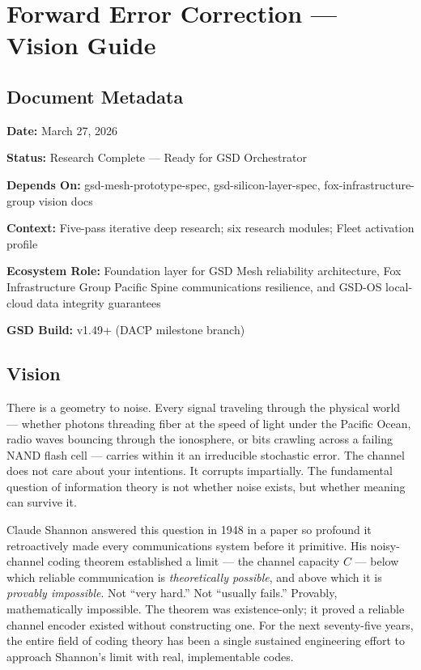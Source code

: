 \documentclass[11pt,letterpaper]{article}
\newcommand{\stageheader}[2]{%
  \noindent\colorbox{#2}{\makebox[\textwidth][l]{%
    \textcolor{white}{\bfseries\sffamily\hspace{6pt}#1\hspace{6pt}}}}%
  \vspace{0.5em}\par%
}
\newcommand{\metafield}[2]{\textbf{\sffamily #1:} #2\par}
\begin{document}
\stageheader{STAGE 1 --- VISION DOCUMENT}{primary}

\section{Forward Error Correction --- Vision Guide}

\subsection{Document Metadata}

\metafield{Date}{March 27, 2026}
\metafield{Status}{Research Complete --- Ready for GSD Orchestrator}
\metafield{Depends On}{gsd-mesh-prototype-spec, gsd-silicon-layer-spec, fox-infrastructure-group vision docs}
\metafield{Context}{Five-pass iterative deep research; six research modules; Fleet activation profile}
\metafield{Ecosystem Role}{Foundation layer for GSD Mesh reliability architecture, Fox Infrastructure Group Pacific Spine communications resilience, and GSD-OS local-cloud data integrity guarantees}
\metafield{GSD Build}{v1.49+ (DACP milestone branch)}

\subsection{Vision}

There is a geometry to noise. Every signal traveling through the physical world --- whether photons threading fiber at the speed of light under the Pacific Ocean, radio waves bouncing through the ionosphere, or bits crawling across a failing NAND flash cell --- carries within it an irreducible stochastic error. The channel does not care about your intentions. It corrupts impartially. The fundamental question of information theory is not whether noise exists, but whether meaning can survive it.

Claude Shannon answered this question in 1948 in a paper so profound it retroactively made every communications system before it primitive. His noisy-channel coding theorem established a limit --- the channel capacity $C$ --- below which reliable communication is \textit{theoretically possible}, and above which it is \textit{provably impossible}. Not ``very hard.'' Not ``usually fails.'' Provably, mathematically impossible. The theorem was existence-only; it proved a reliable channel encoder existed without constructing one. For the next seventy-five years, the entire field of coding theory has been a single sustained engineering effort to approach Shannon's limit with real, implementable codes.
\end{document}
